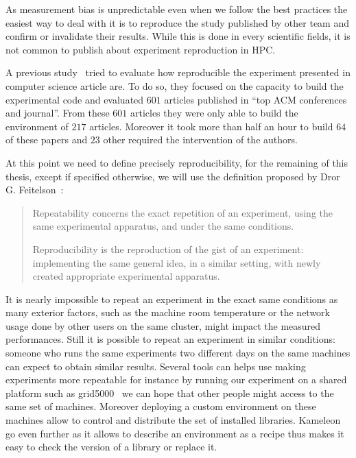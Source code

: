 As measurement bias is unpredictable even when we follow the best practices the easiest way to deal with it is to reproduce the study published by other team and confirm or invalidate their results.
While this is done in every scientific fields, it is not common to publish about experiment reproduction in \gls{HPC}.

A previous study~\cite{Collberg15Repeatability} tried to evaluate how reproducible the experiment presented in computer science article are.
To do so, they focused on the capacity to build the experimental code and evaluated $601$ articles published in “top ACM conferences and journal”.
From these $601$ articles they were only able to build the environment of $217$ articles.
Moreover it took more than half an hour to build $64$ of these papers and $23$ other required the intervention of the authors.

At this point we need to define precisely reproducibility, for the remaining
of this thesis, except if specified otherwise, we will use the definition
proposed by Dror G. Feitelson~\cite{Feitelson15From}:

\begin{quote}
    Repeatability concerns the exact repetition of an experiment, using the same experimental apparatus, and under the same conditions.

    Reproducibility is the reproduction of the gist of an experiment: implementing the same general idea, in a similar setting, with newly created appropriate experimental apparatus.
\end{quote}

It is nearly impossible to repeat an experiment in the exact same conditions as many exterior factors, such as the machine room temperature or the network usage done by other users on the same cluster, might impact the measured performances.
Still it is possible to repeat an experiment in similar conditions: someone who runs the same experiments two different days on the same machines can expect to obtain similar results.
Several tools can helps use making experiments more repeatable for instance by running our experiment on a shared platform such as grid5000~\cite{Cappello05Grid5000} we can hope that other people might access to the same set of machines.
Moreover deploying a custom environment on these machines allow to control and distribute the set of installed libraries.
Kameleon~\cite{Ruiz15Reconstructable} go even further as it allows to describe an environment as a recipe thus makes it easy to check the version of a library or replace it.

